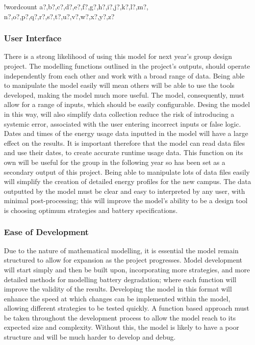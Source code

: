 \documentclass[fontsize=9.5pt]{extarticle}
\numberwithin{figure}{section} %
\newcounter{words}
\newenvironment{counted}{%
  \setcounter{words}{0}
  \SearchList!{wordcount}{\stepcounter{words}}
    {a?,b?,c?,d?,e?,f?,g?,h?,i?,j?,k?,l?,m?,
    n?,o?,p?,q?,r?,s?,t?,u?,v?,w?,x?,y?,z?}
  \UndoBoundary{'}
  \SearchOrder{p;}}{%
  \StopSearching}
\begin{document}
\begin{counted}
\subsubsection{User Interface}\label{user-interface}

There is a strong likelihood of using this model for next year's group
design project. The modelling functions outlined in the project's
outputs, should operate independently from each other and work with a
broad range of data. Being able to manipulate the model easily will mean
others will be able to use the tools developed, making the model much
more useful. The model, consequently, must allow for a range of inputs,
which should be easily configurable. Desing the model in this way, will
also simplify data collection reduce the risk of introducing a systemic
error, associated with the user entering incorrect inputs or false
logic. Dates and times of the energy usage data inputted in the model
will have a large effect on the results. It is important therefore that
the model can read data files and use their dates, to create accurate
runtime usage data. This function on its own will be useful for the
group in the following year so has been set as a secondary output of
this project. Being able to manipulate lots of data files easily will
simplify the creation of detailed energy profiles for the new campus.
The data outputted by the model must be clear and easy to interpreted by
any user, with minimal post-processing; this will improve the model's
ability to be a design tool is choosing optimum strategies and battery
specifications.

\subsubsection{Ease of Development}\label{ease-of-development}

Due to the nature of mathematical modelling, it is essential the model
remain structured to allow for expansion as the project progresses.
Model development will start simply and then be built upon,
incorporating more strategies, and more detailed methods for modelling
battery degradation; where each function will improve the validity of
the results. Developing the model in this format will enhance the speed
at which changes can be implemented within the model, allowing different
strategies to be tested quickly. A function based approach must be taken
throughout the development process to allow the model reach to its
expected size and complexity. Without this, the model is likely to have
a poor structure and will be much harder to develop and debug.


\end{counted}
\end{document}
